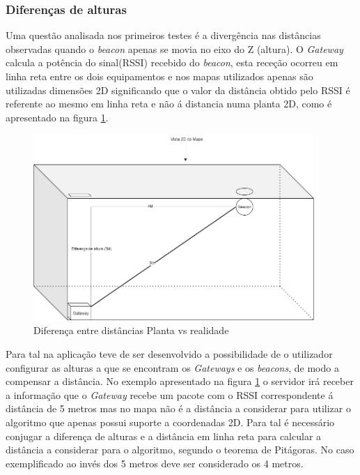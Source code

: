 \subsubsection{Diferenças de alturas}

\par Uma questão analisada nos primeiros testes é a divergência nas distâncias observadas quando o \textit{beacon} apenas se movia no eixo do Z (altura). O \textit{Gateway} calcula a potência do sinal(RSSI) recebido do \textit{beacon}, esta receção ocorreu em linha reta entre os dois equipamentos e nos mapas utilizados apenas são utilizadas dimensões 2D significando que o valor da distância obtido pelo RSSI é referente ao mesmo em linha reta e não á distancia numa planta 2D, como é apresentado na figura \ref{altura1}.

\begin{figure}[ht]
\centering
\includegraphics[width=0.95\textwidth]{images/disr.png}
\caption{Diferença entre distâncias Planta vs realidade}\label{altura1}
\end{figure}


\par Para tal na aplicação teve de ser desenvolvido a possibilidade de o utilizador configurar as alturas a que se encontram os \textit{Gateways} e os \textit{beacons}, de modo a compensar a distância. No exemplo apresentado na figura \ref{altura1} o servidor irá receber a informação que o \textit{Gateway} recebe um pacote com o RSSI correspondente á distância de 5 metros mas no mapa não é a distância a considerar para utilizar o algoritmo que apenas possui suporte a coordenadas 2D. Para tal é necessário conjugar a diferença de alturas e a distância em linha reta para calcular a distância a considerar para o algoritmo, segundo o teorema de Pitágoras. No caso exemplificado ao invés dos 5 metros deve ser considerado os 4 metros.

